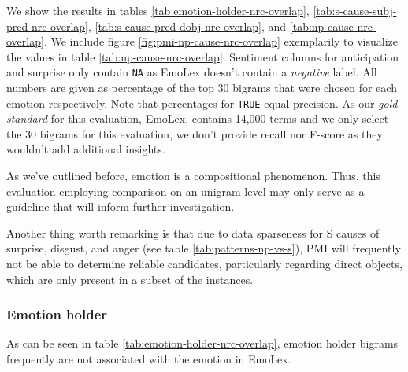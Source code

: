 We show the results in tables \ref{tab:emotion-holder-nrc-overlap}, \ref{tab:s-cause-subj-pred-nrc-overlap}, \ref{tab:s-cause-pred-dobj-nrc-overlap}, and \ref{tab:np-cause-nrc-overlap}. We include figure \ref{fig:pmi-np-cause-nrc-overlap} exemplarily to visualize the values in table \ref{tab:np-cause-nrc-overlap}. Sentiment columns for anticipation and surprise only contain \texttt{NA} as EmoLex doesn't contain a \textit{negative} label. All numbers are given as percentage of the top 30 bigrams that were chosen for each emotion respectively. Note that percentages for \texttt{TRUE} equal precision. As our \textit{gold standard} for this evaluation, EmoLex, contains 14,000 terms and we only select the 30 bigrams for this evaluation, we don't provide recall nor F-score as they wouldn't add additional insights.

As we've outlined before, emotion is a compositional phenomenon. Thus, this evaluation employing comparison on an unigram-level may only serve as a guideline that will inform further investigation.

Another thing worth remarking is that due to data sparseness for S causes of surprise, disgust, and anger (see table \ref{tab:patterns-np-vs-s}), PMI will frequently not be able to determine reliable candidates, particularly regarding direct objects, which are only present in a subset of the instances.

\subsubsection{Emotion holder}

As can be seen in table \ref{tab:emotion-holder-nrc-overlap}, emotion holder bigrams frequently are not associated with the emotion in EmoLex.

